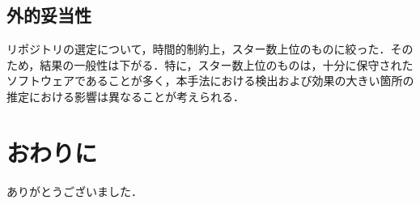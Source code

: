 \documentclass[submit,techrep,noauthor]{ipsj}
\begin{document}
\subsection{外的妥当性}
リポジトリの選定について，時間的制約上，スター数上位のものに絞った．そのため，結果の一般性は下がる．特に，スター数上位のものは，十分に保守されたソフトウェアであることが多く，本手法における検出および効果の大きい箇所の推定における影響は異なることが考えられる．

\section{おわりに}
\label{sec7:format}


\begin{acknowledgment}
ありがとうございました．
\end{acknowledgment}





\end{document}
